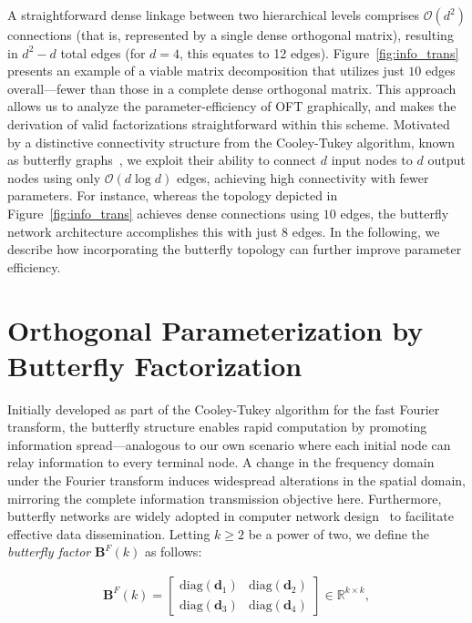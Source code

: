 A straightforward dense linkage between two hierarchical levels comprises $\mathcal{O}(d^2)$ connections (that is, represented by a single dense orthogonal matrix), resulting in $d^2-d$ total edges (for $d=4$, this equates to 12 edges). Figure~\ref{fig:info_trans} presents an example of a viable matrix decomposition that utilizes just $10$ edges overall—fewer than those in a complete dense orthogonal matrix. This approach allows us to analyze the parameter-efficiency of OFT graphically, and makes the derivation of valid factorizations straightforward within this scheme. Motivated by a distinctive connectivity structure from the Cooley-Tukey algorithm, known as butterfly graphs~\cite{cooley1965algorithm}, we exploit their ability to connect $d$ input nodes to $d$ output nodes using only $\mathcal{O}(d\log d)$ edges, achieving high connectivity with fewer parameters. For instance, whereas the topology depicted in Figure~\ref{fig:info_trans} achieves dense connections using $10$ edges, the butterfly network architecture accomplishes this with just $8$ edges. In the following, we describe how incorporating the butterfly topology can further improve parameter efficiency.

\section{Orthogonal Parameterization by Butterfly Factorization}

Initially developed as part of the Cooley-Tukey algorithm for the fast Fourier transform, the butterfly structure enables rapid computation by promoting information spread—analogous to our own scenario where each initial node can relay information to every terminal node. A change in the frequency domain under the Fourier transform induces widespread alterations in the spatial domain, mirroring the complete information transmission objective here. Furthermore, butterfly networks are widely adopted in computer network design~\cite{solihin2015fundamentals,li2011linear} to facilitate effective data dissemination. Letting $k\geq 2$ be a power of two, we define the \emph{butterfly factor} $\bm{B}^F(k)$ as follows:

\begin{equation}\label{eq:but_factor}
\begin{aligned}
    \bm{B}^F(k)=\begin{bmatrix}
    \text{diag}(\bm{d}_1) & \text{diag}(\bm{d}_2) \\
    \text{diag}(\bm{d}_3) & \text{diag}(\bm{d}_4)
    \end{bmatrix}\in\mathbb{R}^{k\times k},
\end{aligned}
\end{equation}

